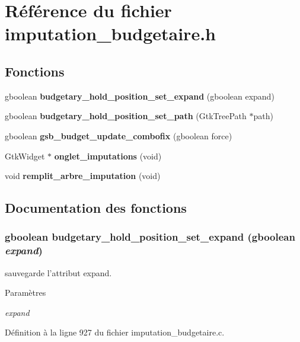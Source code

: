 \section{Référence du fichier imputation\_\-budgetaire.h}
\label{imputation__budgetaire_8h}
\subsection*{Fonctions}
\begin{DoxyCompactItemize}
\item 
gboolean {\bf budgetary\_\-hold\_\-position\_\-set\_\-expand} (gboolean expand)
\item 
gboolean {\bf budgetary\_\-hold\_\-position\_\-set\_\-path} (GtkTreePath $\ast$path)
\item 
gboolean {\bf gsb\_\-budget\_\-update\_\-combofix} (gboolean force)
\item 
GtkWidget $\ast$ {\bf onglet\_\-imputations} (void)
\item 
void {\bf remplit\_\-arbre\_\-imputation} (void)
\end{DoxyCompactItemize}


\subsection{Documentation des fonctions}
\subsubsection[{budgetary\_\-hold\_\-position\_\-set\_\-expand}]{\setlength{\rightskip}{0pt plus 5cm}gboolean budgetary\_\-hold\_\-position\_\-set\_\-expand (gboolean {\em expand})}\label{imputation__budgetaire_8h_a3266a447db85ea0aff52f82aa54bbbd8}
sauvegarde l'attribut expand.


\begin{DoxyParams}{Paramètres}
\item[{\em expand}]\end{DoxyParams}


Définition à la ligne 927 du fichier imputation\_\-budgetaire.c.

